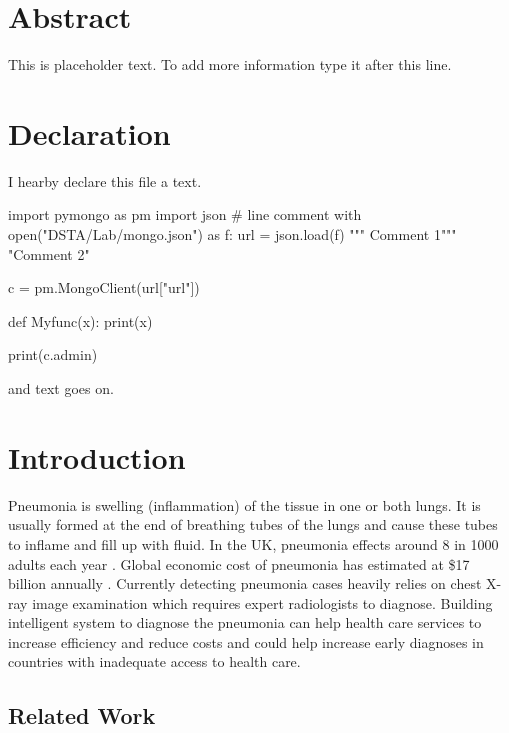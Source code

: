 \documentclass[12pt, twoside, a4paper]{article}
\begin{document}
\section*{Abstract}
This is placeholder text. To add more information type it after this line.\\
\clearpage


\section*{Declaration}
I hearby declare this file a text.

\begin{python}
    import pymongo as pm
    import json
    # line comment
    with open("DSTA/Lab/mongo.json") as f:
    url = json.load(f)
    """ Comment 1"""
    "Comment 2"

    c = pm.MongoClient(url["url"])

    def Myfunc(x):
        print(x)

    print(c.admin)
\end{python}
and text goes on.\\
\clearpage

\tableofcontents
\thispagestyle{empty}
\cleardoublepage
    

\setcounter{page}{1}


\section{Introduction}

Pneumonia is swelling (inflammation) of the tissue in one or both lungs. It is usually formed at the end of breathing tubes of the lungs and cause these tubes to inflame and fill up with fluid. In the UK, pneumonia effects around 8 in 1000 adults each year \cite{nhs}. Global economic cost of pneumonia has estimated at \$17 billion annually \cite{cost}. Currently detecting pneumonia cases heavily relies on chest X-ray image examination which requires expert radiologists to diagnose. Building intelligent system to diagnose the pneumonia can help  health care services to increase efficiency and reduce costs and could help increase early diagnoses in countries with inadequate access to health care.

\subsection{Related Work}
\end{document}
